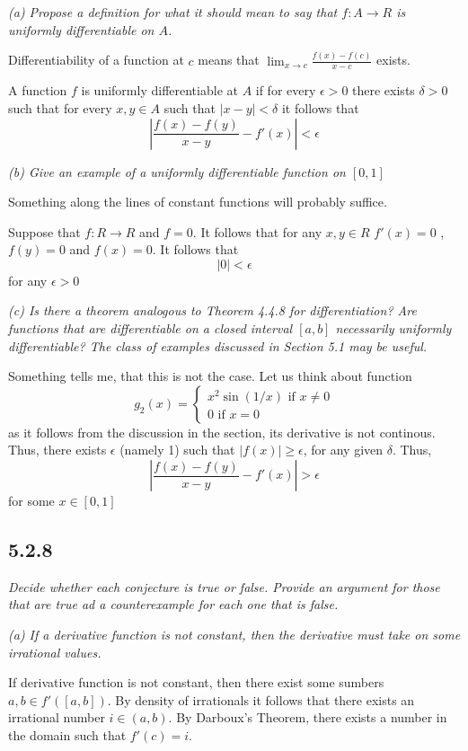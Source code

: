 \documentclass[11pt,oneside,titlepage]{book}
\begin{document}
\textit{(a) Propose a definition for what it should mean to say that
  $f: A \to R$ is uniformly differentiable on $A$.}

Differentiability of a function at $c$ means that
$\lim_{x \to c}\frac{f(x) - f(c)}{x - c}$
exists. 

A function $f$ is uniformly differentiable at $A$ if for every $\epsilon > 0$
there exists $\delta > 0$ such that for every $x, y \in A$ such that
$|x - y| < \delta$ it follows that 
$$\left|\frac{f(x) - f(y)}{x - y} - f'(x)\right| < \epsilon$$

\textit{(b) Give an example of a uniformly differentiable function on $[0, 1]$}

Something along the lines of constant functions will probably suffice.

Suppose that $f: R \to R$ and  $f = 0$. It follows that for any
$x, y \in R$ $f'(x) = 0$ , $f(y) = 0$ and $f(x) = 0$. It follows that
$$|0| < \epsilon$$
for any $\epsilon > 0$

\textit{(c) Is there a theorem analogous to Theorem 4.4.8 for differentiation?
  Are functions that are differentiable on a closed interval $[a, b]$
  necessarily uniformly differentiable? The class of examples discussed in
  Section 5.1 may be useful.}

Something tells me, that this is not the case. Let us think about
function
\begin{equation}
  g_2(x) =
  \begin{cases}
    x^2 \sin(1/x)\text{ if } x \neq 0 \\
    0 \text{ if } x = 0
  \end{cases}
\end{equation}
as it follows from the discussion in the section, its derivative is not
continous. Thus, there exists $\epsilon$ (namely 1)
such that $|f(x)| \geq \epsilon$, for any given $\delta$. Thus,
$$|\frac{f(x) - f(y)}{x - y} - f'(x)| > \epsilon$$
for some $x \in [0, 1]$

\subsection*{5.2.8}
\textit{Decide whether each conjecture is true or false. Provide an argument
  for those that are true ad a counterexample for each one that is false.}

\textit{(a) If a derivative function is not constant, then the derivative must
  take on some irrational values.}

If derivative function is not constant, then there exist some sumbers
$a, b \in f'([a, b])$. By density of irrationals it follows that there exists
an irrational number  $i \in (a, b)$. By Darboux's Theorem, there exists
a number in the domain such that $f'(c) = i$.
\end{document}
